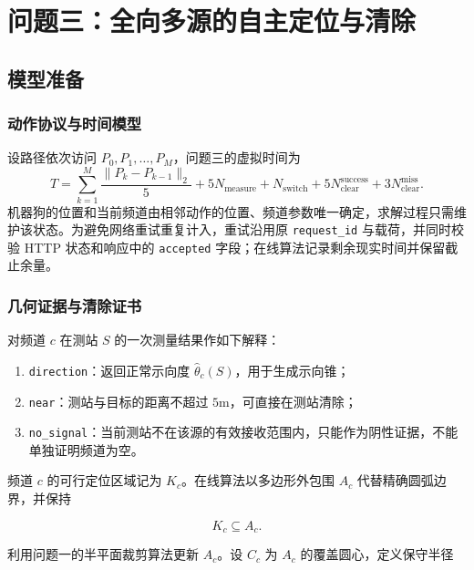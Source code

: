 \section{问题三：全向多源的自主定位与清除}

\subsection{模型准备}

\subsubsection{动作协议与时间模型}

设路径依次访问 $P_0,P_1,\ldots,P_M$，问题三的虚拟时间为
\begin{equation}
T=\sum_{k=1}^{M}\frac{\lVert P_k-P_{k-1}\rVert_2}{5}
+5N_{\mathrm{measure}}+N_{\mathrm{switch}}
+5N_{\mathrm{clear}}^{\mathrm{success}}+3N_{\mathrm{clear}}^{\mathrm{miss}}.
\label{eq:q3_time}
\end{equation}
机器狗的位置和当前频道由相邻动作的位置、频道参数唯一确定，求解过程只需维护该状态。为避免网络重试重复计入，重试沿用原 \texttt{request\_id} 与载荷，并同时校验 HTTP 状态和响应中的 \texttt{accepted} 字段；在线算法记录剩余现实时间并保留截止余量。

\subsubsection{几何证据与清除证书}

对频道 $c$ 在测站 $S$ 的一次测量结果作如下解释：

\begin{enumerate}
\item \texttt{direction}：返回正常示向度 $\hat\theta_c(S)$，用于生成示向锥；
\item \texttt{near}：测站与目标的距离不超过 $5\mathrm{m}$，可直接在测站清除；
\item \texttt{no\_signal}：当前测站不在该源的有效接收范围内，只能作为阴性证据，不能单独证明频道为空。
\end{enumerate}

频道 $c$ 的可行定位区域记为 $K_c$。在线算法以多边形外包围 $A_c$ 代替精确圆弧边界，并保持

\begin{equation}
K_c\subseteq A_c.
\label{eq:q3_outer_contain}
\end{equation}

利用问题一的半平面裁剪算法更新 $A_c$\cite{sutherland1974}。设 $C_c$ 为 $A_c$ 的覆盖圆心，定义保守半径

